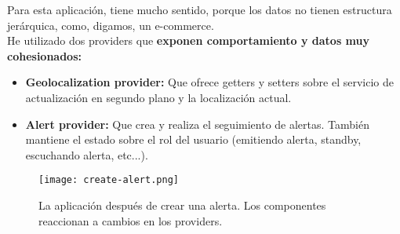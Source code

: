 Para esta aplicación, tiene mucho sentido, porque los datos no tienen estructura jerárquica, como, digamos, un e-commerce. \\
He utilizado dos providers que \textbf{exponen comportamiento y datos muy cohesionados:}
\begin{itemize}
	\item \textbf{Geolocalization provider:} Que ofrece getters y setters sobre el servicio de actualización en segundo plano y la localización actual.
	\item \textbf{Alert provider:} Que crea y realiza el seguimiento de alertas. También mantiene el estado sobre el rol del usuario (emitiendo alerta, standby, escuchando alerta, etc...).
\end{itemize}

\begin{figure}[H]\label{fig:alert}
	\centering	
	\texttt{[image: create-alert.png]}
	\caption{La aplicación después de crear una alerta. Los componentes reaccionan a cambios en los providers.}
	\end{figure}
